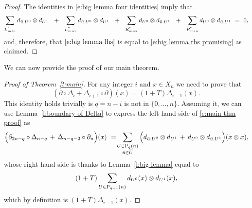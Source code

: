 \begin{proof}
	The identities in \eqref{e:big lemma four identities} imply that
	\begin{equation} \label{e:big lemma zero sum}
	\sum_{\overline{L}_{min}^{e}} d_{\bu.U^0} \otimes d_{U^1}\ \ +\ \
	\sum_{\overline{L}_{max}^{o}} d_{\bu.U^0} \otimes d_{U^1}\ \ +\ \
	\sum_{\overline{R}_{max}^{e}} d_{U^0} \otimes d_{\bu.U^1}\ \ +\ \ 
	\sum_{\overline{R}_{min}^{o}} d_{U^0} \otimes d_{\bu.U^1}\ =\ 0,
	\end{equation}
	and, therefore, that $\eqref{e:big lemma lhs}$ is equal to \eqref{e:big lemma rhs promising} as claimed.
\end{proof}

We can now provide the proof of our main theorem.

\begin{proof}[Proof of Theorem~\ref{t:main}]
	For any integer $i$ and $x \in X_n$ we need to prove that
	\begin{equation} \label{e:main thm proof}
	(\partial \circ \Delta_{i} + \Delta_{i+1} \circ \partial)(x) = (1 + T) \Delta_{i-1}(x).
	\end{equation}
	This identity holds trivially is $q = n-i$ is not in $\{0, \dots, n\}$.
	Assuming it, we can use Lemma~\ref{l:boundary of Delta} to express the left hand side of \eqref{e:main thm proof} as
	\begin{equation*}
	\Big( \partial_{2n-q} \circ \Delta_{n - q} \, +\, \Delta_{n-q-2} \circ \partial_n \Big) (x) \ = \! 
	\sum_{\substack{U \in \P_{q}(n) \\ \bu \in \overline{U}}} \Big( d_{\bu.U^0} \otimes d_{U^1} \, + \, d_{U^0} \otimes d_{\bu.U^1} \Big) (x \otimes x),
	\end{equation*}
	whose right hand side is thanks to Lemma~\ref{l:big lemma} equal to
	\begin{equation*}
	(1+T) \sum_{U \in \P_{q+1}(n)} d_{U^0}(x) \otimes d_{U^1}(x),
	\end{equation*}
	which by definition is $(1+T)\Delta_{i-1}(x)$.
\end{proof}